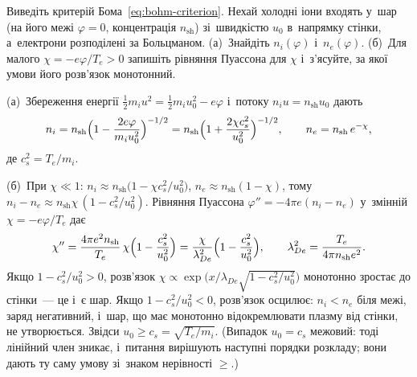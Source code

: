 \begin{problem}\label{prb:BohmCriterion}
	Виведіть критерій Бома~\eqref{eq:bohm-criterion}. Нехай холодні іони входять у~шар (на його межі
	$\varphi=0$, концентрація $n_\mathrm{sh}$) зі~швидкістю $u_0$ в~напрямку стінки, а~електрони
	розподілені за Больцманом. (а)~Знайдіть $n_i(\varphi)$ і~$n_e(\varphi)$. (б)~Для малого
	$\chi=-e\varphi/T_e>0$ запишіть рівняння Пуассона для $\chi$ і~з'ясуйте, за якої умови його розв'язок
	монотонний.
	\begin{solution}
		(а)~Збереження енергії $\tfrac12m_iu^2=\tfrac12m_iu_0^2-e\varphi$ і~потоку
		$n_iu=n_\mathrm{sh}u_0$ дають
		\[ n_i=n_\mathrm{sh}\Bigl(1-\frac{2e\varphi}{m_iu_0^2}\Bigr)^{-1/2}
		=n_\mathrm{sh}\Bigl(1+\frac{2\chi c_s^2}{u_0^2}\Bigr)^{-1/2},\qquad
		n_e=n_\mathrm{sh}\,e^{-\chi}, \]
		де $c_s^2=T_e/m_i$.

		(б)~При $\chi\ll1$: $n_i\approx n_\mathrm{sh}\bigl(1-\chi c_s^2/u_0^2\bigr)$,
		$n_e\approx n_\mathrm{sh}(1-\chi)$, тому
		$n_i-n_e\approx n_\mathrm{sh}\chi\,(1-c_s^2/u_0^2)$. Рівняння Пуассона
		$\varphi''=-4\pi e(n_i-n_e)$ у~змінній $\chi=-e\varphi/T_e$ дає
		\[ \chi''=\frac{4\pi e^2n_\mathrm{sh}}{T_e}\,\chi\Bigl(1-\frac{c_s^2}{u_0^2}\Bigr)
		=\frac{\chi}{\lambda_{De}^2}\Bigl(1-\frac{c_s^2}{u_0^2}\Bigr),\qquad
		\lambda_{De}^2=\frac{T_e}{4\pi n_\mathrm{sh}e^2}. \]
		Якщо $1-c_s^2/u_0^2>0$, розв'язок $\chi\propto\exp\bigl(x/\lambda_{De}\sqrt{1-c_s^2/u_0^2}\bigr)$
		монотонно зростає до стінки~--- це і~є шар. Якщо $1-c_s^2/u_0^2<0$, розв'язок
		осцилює: $n_i<n_e$ біля межі, заряд негативний, і~шар, що має монотонно відокремлювати плазму від стінки,
		не утворюється. Звідси $u_0\ge c_s=\sqrt{T_e/m_i}$. (Випадок $u_0=c_s$ межовий: тоді лінійний член
		зникає, і~питання вирішують наступні порядки розкладу; вони дають ту саму умову зі~знаком
		нерівності $\ge$.)
	\end{solution}
\end{problem}

